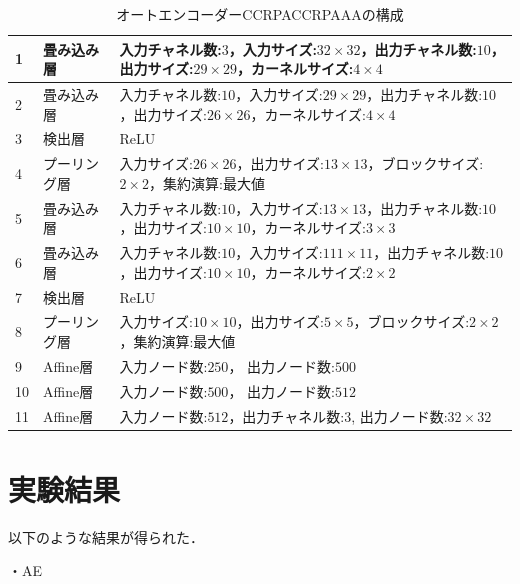 \documentclass[12pt]{jsarticle}
\begin{document}
\begin{table}[ht]
\begin{center}
\label{table:CCRPACCRPAAA}
\caption{オートエンコーダーCCRPACCRPAAAの構成}
\begin{tabularx}{0.9\linewidth}{|l|l|X|}
\hline
1 & 畳み込み層 & 入力チャネル数:$3$，入力サイズ:$32 \times 32$，出力チャネル数:$10$，出力サイズ:$29 \times 29$，カーネルサイズ:$4 \times 4$ \\
\hline
2& 畳み込み層 & 入力チャネル数:$10$，入力サイズ:$29 \times 29$，出力チャネル数:$10$，出力サイズ:$26 \times 26$，カーネルサイズ:$4 \times 4$ \\
\hline
3 & 検出層 & ReLU \\
\hline
4 & プーリング層 & 入力サイズ:$26 \times 26$，出力サイズ:$13 \times 13$，ブロックサイズ:$2 \times 2$，集約演算:最大値 \\
\hline
5 & 畳み込み層 & 入力チャネル数:$10$，入力サイズ:$13 \times 13$，出力チャネル数:$10$，出力サイズ:$10 \times 10$，カーネルサイズ:$3 \times 3$ \\
\hline
6 & 畳み込み層 & 入力チャネル数:$10$，入力サイズ:$111 \times 11$，出力チャネル数:$10$，出力サイズ:$10 \times 10$，カーネルサイズ:$2 \times 2$ \\
\hline
7 & 検出層 & ReLU \\
\hline
8 & プーリング層 & 入力サイズ:$10 \times 10$，出力サイズ:$5 \times 5$，ブロックサイズ:$2 \times 2$，集約演算:最大値 \\
\hline
9 & Affine層 & 入力ノード数:$250$， 出力ノード数:$ 500 $ \\
\hline
10 & Affine層 & 入力ノード数:$500$， 出力ノード数:$ 512 $ \\
\hline
11 & Affine層 & 入力ノード数:$512$，出力チャネル数:$3$, 出力ノード数:$ 32 \times 32 $ \\
\hline
\end{tabularx}
\end{center}
\end{table}


\clearpage

\section{実験結果}

以下のような結果が得られた．

・AE
\end{document}
